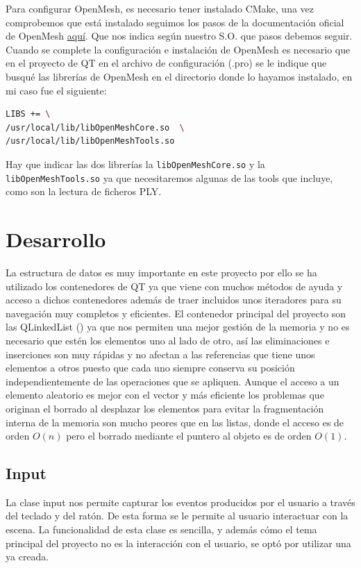 Para configurar OpenMesh, es necesario tener instalado CMake, una vez comprobemos que está instalado seguimos los pasos de la documentación oficial de OpenMesh \href{URLhttps://www.openmesh.org/media/Documentations/OpenMesh-7.0-Documentation/a03933.html}{aquí}. Que nos indica según nuestro S.O. que pasos debemos seguir. Cuando se complete la configuración e instalación de OpenMesh es necesario que en el proyecto de QT en el archivo de configuración (.pro) se le indique que busqué las librerías de OpenMesh en el directorio donde lo hayamos instalado, en mi caso fue el siguiente:
\begin{lstlisting}[language=bash]
LIBS += \
/usr/local/lib/libOpenMeshCore.so  \
/usr/local/lib/libOpenMeshTools.so
\end{lstlisting}

Hay que indicar las dos librerías la \texttt{libOpenMeshCore.so} y la \texttt{libOpenMeshTools.so} ya que necesitaremos algunas de las tools que incluye, como son la lectura de ficheros PLY.

\section{ Desarrollo}

La estructura de datos es muy importante en este proyecto por ello se ha utilizado los contenedores de QT ya que viene con muchos métodos de ayuda y acceso a dichos contenedores además de traer incluidos unos iteradores para su navegación muy completos y eficientes. El contenedor principal del proyecto son las QLinkedList (\cite{QLinkedListClassQt}) ya que nos permiten una mejor gestión de la memoria y no es necesario que estén los elementos uno al lado de otro, así las eliminaciones e inserciones son muy rápidas y no afectan a las referencias que tiene unos elementos a otros puesto que cada uno siempre conserva su posición independientemente de las operaciones que se apliquen. Aunque el acceso a un elemento aleatorio es mejor con el vector y más eficiente los problemas que originan el borrado al desplazar los elementos para evitar la fragmentación interna de la memoria son mucho peores que en las listas, donde el acceso es de orden $O(n)$ pero el borrado mediante el puntero al objeto es de orden $O(1)$.

\subsection{ Input}
La clase input nos permite capturar los eventos producidos por el usuario a través del teclado y del ratón. De esta forma se le permite al usuario interactuar con la escena. La funcionalidad de esta clase es sencilla, y además cómo el tema principal del proyecto no es la interacción con el usuario, se optó por utilizar una ya creada.\\

